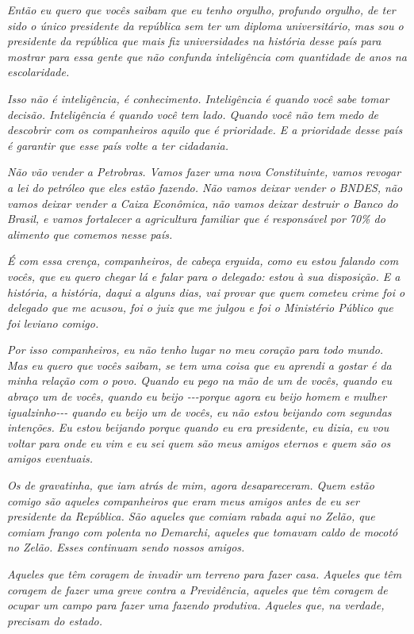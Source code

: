 \emph{Então eu quero que vocês saibam que eu tenho orgulho, profundo
orgulho, de ter sido o único presidente da república sem ter um diploma
universitário, mas sou o presidente da república que mais fiz
universidades na história desse país para mostrar para essa gente que
não confunda inteligência com quantidade de anos na escolaridade.}

\emph{Isso não é inteligência, é conhecimento. Inteligência é quando
você sabe tomar decisão. Inteligência é quando você tem lado. Quando
você não tem medo de descobrir com os companheiros aquilo que é
prioridade. E a prioridade desse país é garantir que esse país volte a
ter cidadania.}

\emph{Não vão vender a Petrobras. Vamos fazer uma nova Constituinte,
vamos revogar a lei do petróleo que eles estão fazendo. Não vamos deixar
vender o BNDES, não vamos deixar vender a Caixa Econômica, não vamos
deixar destruir o Banco do Brasil, e vamos fortalecer a agricultura
familiar que é responsável por 70\% do alimento que comemos nesse país.}

\emph{É com essa crença, companheiros, de cabeça erguida, como eu estou
falando com vocês, que eu quero chegar lá e falar para o delegado: estou
à sua disposição. E a história, a história, daqui a alguns dias, vai
provar que quem cometeu crime foi o delegado que me acusou, foi o juiz
que me julgou e foi o Ministério Público que foi leviano comigo.}

\emph{Por isso companheiros, eu não tenho lugar no meu coração para todo
mundo. Mas eu quero que vocês saibam, se tem uma coisa que eu aprendi a
gostar é da minha relação com o povo. Quando eu pego na mão de um de
vocês, quando eu abraço um de vocês, quando eu beijo -\/-\/-porque agora
eu beijo homem e mulher igualzinho-\/-\/- quando eu beijo um de vocês,
eu não estou beijando com segundas intenções. Eu estou beijando porque
quando eu era presidente, eu dizia, eu vou voltar para onde eu vim e eu
sei quem são meus amigos eternos e quem são os amigos eventuais.}

\emph{Os de gravatinha, que iam atrás de mim, agora desapareceram. Quem
estão comigo são aqueles companheiros que eram meus amigos antes de eu
ser presidente da República. São aqueles que comiam rabada aqui no
Zelão, que comiam frango com polenta no Demarchi, aqueles que tomavam
caldo de mocotó no Zelão. Esses continuam sendo nossos amigos.}

\emph{Aqueles que têm coragem de invadir um terreno para fazer casa.
Aqueles que têm coragem de fazer uma greve contra a Previdência, aqueles
que têm coragem de ocupar um campo para fazer uma fazendo produtiva.
Aqueles que, na verdade, precisam do estado.}

